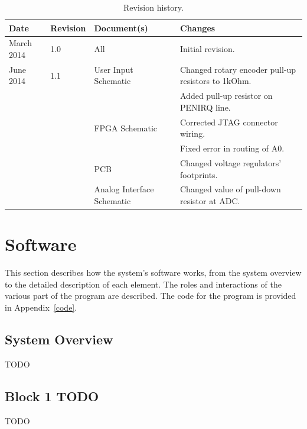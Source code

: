 \documentclass[titlepage]{scrartcl}
\begin{document}
	\begin{table}[h!]
	  \centering
    		\begin{tabular}{|p{2cm} | p{1.5cm} | p{2.5cm} | p{8cm} |}
		 \hline
		 \textbf{Date} & \textbf{Revision} & \textbf{Document(s)} & \textbf{Changes}\\
		 \hline
		 March 2014 & 1.0 & All & Initial revision. \\ \hline
		 June 2014 & 1.1 & User Input Schematic & Changed rotary encoder pull-up resistors to 1kOhm.\\ \cline{4-4}
		                   &       &                                    & Added pull-up resistor on PENIRQ line.\\ \cline{3-4}
		                   &       & FPGA Schematic        & Corrected JTAG connector wiring.\\ \cline{4-4}
		                   &       &                                    & Fixed error in routing of A0.\\ \cline{3-4}
                                     &       & PCB           		     & Changed voltage regulators' footprints.\\ \cline{3-4}
		                   &       & Analog Interface Schematic        & Changed value of pull-down resistor at ADC.\\
		\hline
		\end{tabular}
	     \label{tab:rev_history}
              \caption{Revision history.}
	\end{table}

	\clearpage


	\section{Software}
	This section describes how the system's software works, from the system overview to the detailed description of each element. The roles and interactions of the various part of the program are described. The code for the program is provided in Appendix~\ref{code}.
	
	\subsection{System Overview}
	TODO

	\subsection{Block 1 TODO}
	TODO
\end{document}
